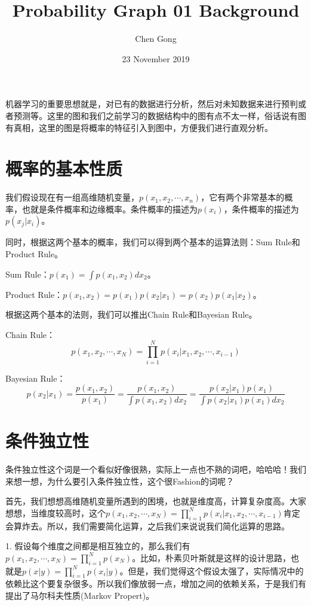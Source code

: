 \documentclass[a4paper]{article}
\title{Probability Graph 01 Background}
\author{Chen Gong}
\date{23 November 2019}
\begin{document}
\maketitle
机器学习的重要思想就是，对已有的数据进行分析，然后对未知数据来进行预判或者预测等。这里的图和我们之前学习的数据结构中的图有点不太一样，俗话说有图有真相，这里的图是将概率的特征引入到图中，方便我们进行直观分析。

\section{概率的基本性质}
我们假设现在有一组高维随机变量，$p(x_1,x_2,\cdots,x_n)$，它有两个非常基本的概率，也就是条件概率和边缘概率。条件概率的描述为$p(x_i)$，条件概率的描述为$p(x_j|x_i)$。

同时，根据这两个基本的概率，我们可以得到两个基本的运算法则：Sum Rule和Product Rule。

Sum Rule：$p(x_1)=\int p(x_1,x_2)dx_2$。

Product Rule：$p(x_1,x_2) = p(x_1)p(x_2|x_1) = p(x_2)p(x_1|x_2)$。

根据这两个基本的法则，我们可以推出Chain Rule和Bayesian Rule。

Chain Rule：
\begin{equation}
   p(x_1,x_2,\cdots,x_N) = \prod_{i=1}^N p(x_i|x_1,x_2,\cdots,x_{i-1}) 
\end{equation}


Bayesian Rule：
\begin{equation}
    p(x_2|x_1) = \frac{p(x_1,x_2)}{p(x_1)} = \frac{p(x_1,x_2)}{\int p(x_1,x_2)dx_2} = \frac{p(x_2|x_1)p(x_1)}{\int p(x_2|x_1)p(x_1)dx_2}
\end{equation}

\section{条件独立性}
条件独立性这个词是一个看似好像很熟，实际上一点也不熟的词吧，哈哈哈！我们来想一想，为什么要引入条件独立性，这个很Fashion的词呢？

首先，我们想想高维随机变量所遇到的困境，也就是维度高，计算复杂度高。大家想想，当维度较高时，这个$p(x_1,x_2,\cdots,x_N) = \prod_{i=1}^N p(x_i|x_1,x_2,\cdots,x_{i-1}) $肯定会算炸去。所以，我们需要简化运算，之后我们来说说我们简化运算的思路。

1. 假设每个维度之间都是相互独立的，那么我们有$p(x_1,x_2,\cdots,x_N)=\prod_{i=1}^N p(x_N)$。比如，朴素贝叶斯就是这样的设计思路，也就是$p(x|y)=\prod_{i=1}^N p(x_i|y)$。但是，我们觉得这个假设太强了，实际情况中的依赖比这个要复杂很多。所以我们像放弱一点，增加之间的依赖关系，于是我们有提出了马尔科夫性质(Markov Propert)。
\end{document}
